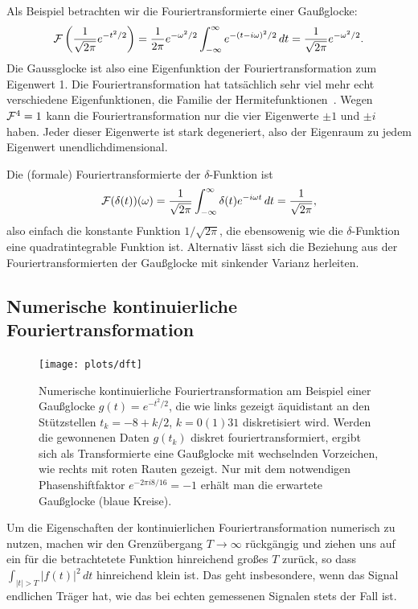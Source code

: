 Als Beispiel betrachten wir die Fouriertransformierte einer Gaußglocke:
\begin{equation}
  \mathcal F\left(\frac{1}{\sqrt{2\pi}}e^{-t^2/2}\right)
  =
  \frac{1}{2\pi}e^{-\omega^2/2}\int_{-\infty}^{\infty} e^{-(t-i\omega)^2/2}\, dt
  =
  \frac{1}{\sqrt{2\pi}}e^{-\omega^2/2}.
\end{equation}
Die Gaussglocke ist also eine Eigenfunktion der Fouriertransformation
zum Eigenwert 1. Die Fouriertransformation hat tatsächlich sehr viel
mehr echt verschiedene Eigenfunktionen, die Familie der
Hermitefunktionen~\cite{pinsky02a}. Wegen $\mathcal F^4=1$ kann die
Fouriertransformation nur die vier Eigenwerte $\pm 1$ und $\pm i$
haben. Jeder dieser Eigenwerte ist stark degeneriert, also der
Eigenraum zu jedem Eigenwert unendlichdimensional.

Die (formale) Fouriertransformierte der $\delta$-Funktion ist
\begin{equation}
  \label{eq:fourierdelta}
  \mathcal F(\delta(t))(\omega)
  =
  \frac{1}{\sqrt{2\pi}}\int_{-\infty}^{\infty}
  \delta(t)e^{-i \omega t}\, dt = \frac{1}{\sqrt{2\pi}},
\end{equation}
also einfach die konstante Funktion $1/\sqrt{2\pi}$, die ebensowenig
wie die $\delta$-Funktion eine quadratintegrable Funktion
ist. Alternativ lässt sich die Beziehung aus der
Fouriertransformierten der Gaußglocke mit sinkender Varianz herleiten.

\subsection{Numerische kontinuierliche Fouriertransformation}
\label{sec:contdft}

\begin{figure}
  \centering
  \texttt{[image: plots/dft]}
  \caption{Numerische kontinuierliche Fouriertransformation am Beispiel einer
  Gaußglocke $g(t) = e^{-t^2/2}$, die wie links gezeigt äquidistant
  an den Stützstellen $t_k=-8 + k/2$, $k=0(1)31$ diskretisiert wird.
  Werden die gewonnenen Daten $g(t_k)$ diskret fouriertransformiert,
  ergibt sich als Transformierte eine Gaußglocke mit wechselnden
  Vorzeichen, wie rechts mit roten Rauten gezeigt. Nur mit dem
  notwendigen Phasenshiftfaktor $e^{-2\pi i 8/16}=-1$ erhält man die
  erwartete Gaußglocke (blaue Kreise).}
  \label{fig:contdft}
\end{figure}

Um die Eigenschaften der kontinuierlichen Fouriertransformation
numerisch zu nutzen, machen wir den Grenzübergang $T\to\infty$
rückgängig und ziehen uns auf ein für die betrachtetete Funktion
hinreichend großes $T$ zurück, so dass $\int_{\lvert t\rvert>T}\lvert
f(t)\rvert^2\, dt$ hinreichend klein ist. Das geht insbesondere, wenn
das Signal endlichen Träger hat, wie das bei echten gemessenen
Signalen stets der Fall ist.

